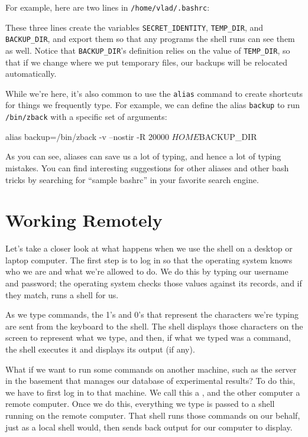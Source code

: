 For example, here are two lines in \texttt{/home/vlad/.bashrc}:


These three lines create the variables \texttt{SECRET\_IDENTITY},
\texttt{TEMP\_DIR}, and \texttt{BACKUP\_DIR}, and export them so that
any programs the shell runs can see them as well. Notice that
\texttt{BACKUP\_DIR}'s definition relies on the value of
\texttt{TEMP\_DIR}, so that if we change where we put temporary files,
our backups will be relocated automatically.

While we're here, it's also common to use the \texttt{alias} command to
create shortcuts for things we frequently type. For example, we can
define the alias \texttt{backup} to run \texttt{/bin/zback} with a
specific set of arguments:

\begin{VerbOut}
alias backup=/bin/zback -v --nostir -R 20000 $HOME $BACKUP_DIR
\end{VerbOut}

As you can see, aliases can save us a lot of typing, and hence a lot of
typing mistakes. You can find interesting suggestions for other aliases
and other bash tricks by searching for ``sample bashrc'' in your
favorite search engine.

\section{Working Remotely}

Let's take a closer look at what happens when we use the shell on a
desktop or laptop computer. The first step is to log in so that the
operating system knows who we are and what we're allowed to do. We do
this by typing our username and password; the operating system checks
those values against its records, and if they match, runs a shell for
us.

As we type commands, the 1's and 0's that represent the characters we're
typing are sent from the keyboard to the shell. The shell displays those
characters on the screen to represent what we type, and then, if what we
typed was a command, the shell executes it and displays its output (if
any).

What if we want to run some commands on another machine, such as the
server in the basement that manages our database of experimental
results? To do this, we have to first log in to that machine. We call
this a , and the other computer a
remote computer. Once we do this, everything we type is passed to a
shell running on the remote computer. That shell runs those commands on
our behalf, just as a local shell would, then sends back output for our
computer to display.


